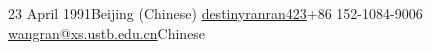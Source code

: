 
\ifswedish


\else

	{23 April 1991}{Beijing (Chinese)}
	{\href{destinyranran423}{destinyranran423}}{+86 152-1084-9006}
	{\href{mailto:wangran@xs.ustb.edu.cn}{wangran@xs.ustb.edu.cn}}{Chinese}

\fi
